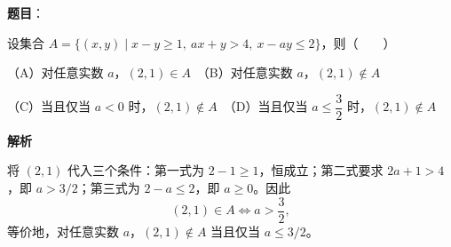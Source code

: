 \begin{answer}

\textbf{题目}：

设集合 $A=\{(x,y)\mid x-y\ge1,\ ax+y>4,\ x-ay\le2\}$，则\mbox{（　　）}

（A）对任意实数 $a$，$(2,1)\in A$　（B）对任意实数 $a$，$(2,1)\notin A$

（C）当且仅当 $a<0$ 时，$(2,1)\notin A$　（D）当且仅当 $a\le\dfrac32$ 时，$(2,1)\notin A$

\textbf{解析}

将 $(2,1)$ 代入三个条件：第一式为 $2-1\ge1$，恒成立；第二式要求 $2a+1>4$，即 $a>3/2$；第三式为 $2-a\le2$，即 $a\ge0$。因此
\nopagebreak[4]
\[
(2,1)\in A\iff a>\frac32,
\]
等价地，对任意实数 $a$，$(2,1)\notin A$ 当且仅当 $a\le3/2$。


\end{answer}

